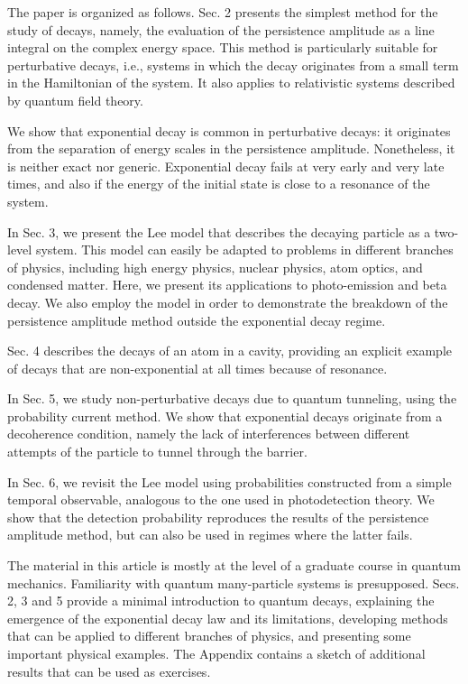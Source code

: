 \documentclass[12pt]{article}
\numberwithin{equation}{section}
\begin{document}
The paper is organized as follows.
  Sec. 2 presents the simplest method for the study of decays, namely, the evaluation of the persistence amplitude as a line integral on the complex energy space. This method is particularly suitable for perturbative decays, i.e., systems in which the decay originates from a small term in the Hamiltonian of the system. It also applies to relativistic systems described by quantum field theory.

  We show that   exponential decay is common in perturbative decays: it originates  from the separation of energy scales in the persistence amplitude. Nonetheless, it is neither exact nor generic. Exponential decay fails at very early and very late times, and also if the energy of the initial state is close to a resonance of the system.

 In  Sec. 3, we present the Lee model that describes the decaying particle as a  two-level system. This model can easily be adapted to problems in different branches of physics, including high energy physics, nuclear physics, atom optics, and condensed matter. Here, we present its applications to photo-emission and beta decay. We also employ the model in order to demonstrate the breakdown of the persistence amplitude method outside the exponential decay regime.

 Sec. 4 describes the decays of an atom in a cavity, providing an explicit example of decays that are non-exponential at all times because of resonance.

In Sec. 5, we study non-perturbative decays due to quantum tunneling, using the probability current method. We show that exponential decays originate from a decoherence condition, namely the lack of interferences between different attempts of the particle to tunnel through the barrier.

In Sec. 6, we revisit the Lee  model using probabilities constructed from a simple temporal observable, analogous to the one used in photodetection theory. We show that the detection probability reproduces the results of the persistence amplitude method, but can also be used in regimes where the latter fails.

The material in this article is mostly at the level of a graduate course in quantum mechanics. Familiarity with quantum many-particle systems is presupposed.
Secs. 2, 3 and  5 provide a minimal   introduction to quantum decays, explaining the emergence of the exponential decay law and its limitations,  developing methods that can be applied to different branches of physics, and presenting some important    physical examples.
The Appendix contains a sketch of  additional results that can be used as exercises.
\end{document}
